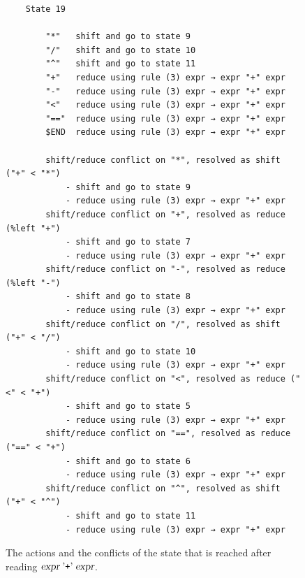 \begin{figure}[!ht]
\centering
\begin{verbatim}
    State 19

        "*"   shift and go to state 9
        "/"   shift and go to state 10
        "^"   shift and go to state 11
        "+"   reduce using rule (3) expr → expr "+" expr
        "-"   reduce using rule (3) expr → expr "+" expr
        "<"   reduce using rule (3) expr → expr "+" expr
        "=="  reduce using rule (3) expr → expr "+" expr
        $END  reduce using rule (3) expr → expr "+" expr

        shift/reduce conflict on "*", resolved as shift ("+" < "*")
            - shift and go to state 9
            - reduce using rule (3) expr → expr "+" expr
        shift/reduce conflict on "+", resolved as reduce (%left "+")
            - shift and go to state 7
            - reduce using rule (3) expr → expr "+" expr
        shift/reduce conflict on "-", resolved as reduce (%left "-")
            - shift and go to state 8
            - reduce using rule (3) expr → expr "+" expr
        shift/reduce conflict on "/", resolved as shift ("+" < "/")
            - shift and go to state 10
            - reduce using rule (3) expr → expr "+" expr
        shift/reduce conflict on "<", resolved as reduce ("<" < "+")
            - shift and go to state 5
            - reduce using rule (3) expr → expr "+" expr
        shift/reduce conflict on "==", resolved as reduce ("==" < "+")
            - shift and go to state 6
            - reduce using rule (3) expr → expr "+" expr
        shift/reduce conflict on "^", resolved as shift ("+" < "^")
            - shift and go to state 11
            - reduce using rule (3) expr → expr "+" expr
\end{verbatim}
\vspace*{-0.3cm}
\caption{The actions and the conflicts of the state that is reached after reading
         $\textsl{expr} \;\mbox{'\texttt{+}'}\; \textsl{expr}$.}
\label{fig:Precedence-Declarations.state19}
\end{figure}
\FloatBarrier

